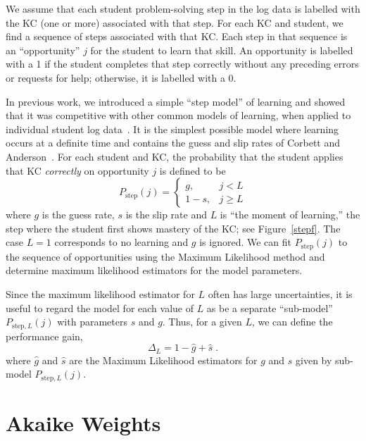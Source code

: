 \documentclass{edm_template}
\begin{document}
We assume that each student problem-solving step in the log data is
labelled with the KC (one or more) associated with that step.  For
each KC and student, we find a sequence of steps associated with
that KC.  Each step in that sequence is an ``opportunity'' $j$ for the
student to learn that skill.  An opportunity is labelled with a 1
if the student completes that step correctly without any preceding
errors or requests for help; otherwise, it is labelled with a 0.

In previous work, we introduced a simple ``step model'' of learning
and showed that it was competitive with other common models
of learning, when applied to individual student log
data~\cite{van_de_sande_applying_2013}.
It is the simplest possible model where learning occurs at
a definite time and contains the guess and slip rates of Corbett and 
Anderson~\cite{corbett_knowledge_1995}.  For each student and KC,
the probability that the student applies that KC {\em correctly} on 
opportunity $j$ is defined to be
%
\begin{equation}
               P_\mathrm{step}(j) = \left\{\begin{array}{cc}
                                       g,& j<L\\
				       1-s,& j\ge L
                                    \end{array}\right. \label{step}
\end{equation}
%
where $g$ is the guess rate, $s$ is the slip rate and 
$L$ is ``the moment of learning,'' the step where the student
first shows mastery of the KC; see Figure~\ref{stepf}.  The case $L=1$
corresponds to no learning and $g$ is ignored.
%
We can fit $P_\mathrm{step}(j)$ to the sequence of opportunities using the
Maximum Likelihood method and determine maximum likelihood estimators
for the model parameters.  

Since the maximum likelihood estimator for $L$ often has large
uncertainties, it is useful to regard the model for each value of $L$
as be a separate ``sub-model''  $P_{\mathrm{step},L}(j)$ with parameters
$s$ and $g$.
Thus, for a given $L$, we can define the performance gain,
%
\begin{equation}
         \Delta_L = 1- \hat{g}+\hat{s}\; . \label{gain}
\end{equation}
%
where $\hat{g}$ and $\hat{s}$ are the
Maximum Likelihood estimators for $g$ and $s$ given by sub-model
$P_{\mathrm{step},L}(j)$. 

\section{Akaike Weights}
\end{document}
